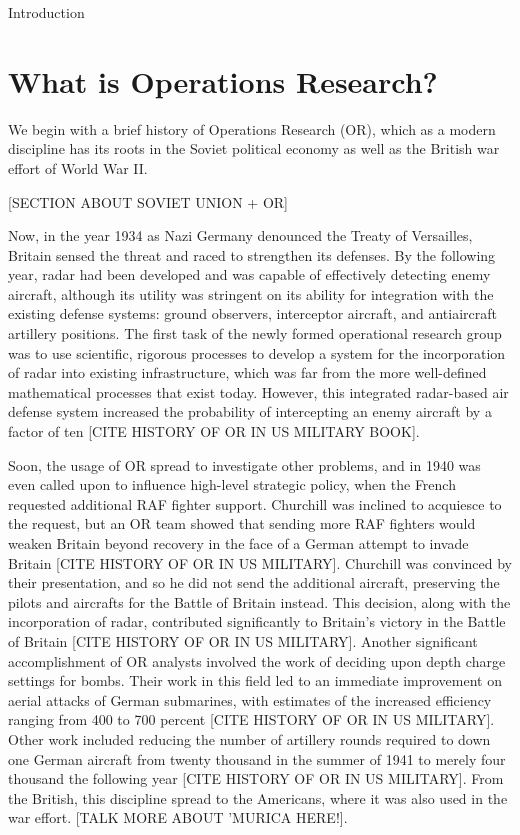 \documentclass[12pt]{pom_thesis}
\begin{document}
\begin{chapter}{Introduction}
\label{Intro}
\section{What is Operations Research?}

	We begin with a brief history of Operations Research (OR), which as a modern discipline has its roots in the Soviet political economy as well as the British war effort of World War II. 
	
	[SECTION ABOUT SOVIET UNION + OR]
	
	Now, in the year 1934 as Nazi Germany denounced the Treaty of Versailles, Britain sensed the threat and raced to strengthen its defenses. By the following year, radar had been developed and was capable of effectively detecting enemy aircraft, although its utility was stringent on its ability for integration with the existing defense systems: ground observers, interceptor aircraft, and antiaircraft artillery positions. The first task of the newly formed operational research group was to use scientific, rigorous processes to develop a system for the incorporation of radar into existing infrastructure, which was far from the more well-defined mathematical processes that exist today. However, this integrated radar-based air defense system increased the probability of intercepting an enemy aircraft by a factor of ten [CITE HISTORY OF OR IN US MILITARY BOOK]. 
	
	 Soon, the usage of OR spread to investigate other problems, and in 1940 was even called upon to influence high-level strategic policy, when the French requested additional RAF fighter support. Churchill was inclined to acquiesce to the request, but an OR team showed that sending more RAF fighters would weaken Britain beyond recovery in the face of a German attempt to invade Britain [CITE HISTORY OF OR IN US MILITARY]. Churchill was convinced by their presentation, and so he did not send the additional aircraft, preserving the pilots and aircrafts for the Battle of Britain instead. This decision, along with the incorporation of radar, contributed significantly to Britain's victory in the Battle of Britain [CITE HISTORY OF OR IN US MILITARY]. 
	Another significant accomplishment of OR analysts involved the work of deciding upon depth charge settings for bombs. Their work in this field led to an immediate improvement on aerial attacks of German submarines, with estimates of the increased efficiency ranging from 400 to 700 percent [CITE HISTORY OF OR IN US MILITARY]. Other work included reducing the number of artillery rounds required to down one German aircraft  from twenty thousand in the summer of 1941 to merely four thousand the following year [CITE HISTORY OF OR IN US MILITARY].
	From the British, this discipline spread to the Americans, where it was also used in the war effort. [TALK MORE ABOUT 'MURICA HERE!].
	

\end{chapter}
\end{document}
